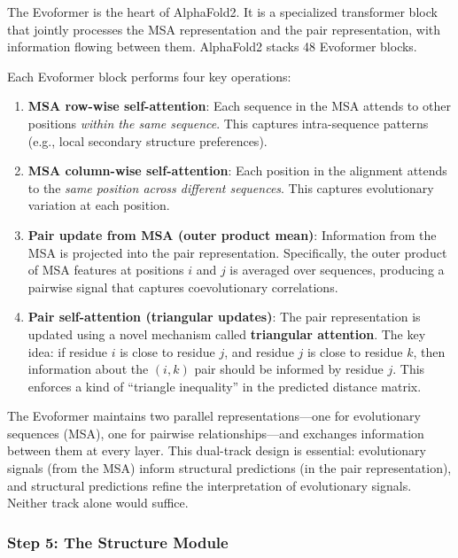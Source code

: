 The Evoformer is the heart of AlphaFold2. It is a specialized transformer block that jointly processes the MSA representation and the pair representation, with information flowing between them. AlphaFold2 stacks 48 Evoformer blocks.

Each Evoformer block performs four key operations:

\begin{enumerate}[leftmargin=1.8em]
  \item \textbf{MSA row-wise self-attention}: Each sequence in the MSA attends to other positions \emph{within the same sequence}. This captures intra-sequence patterns (e.g., local secondary structure preferences).

  \item \textbf{MSA column-wise self-attention}: Each position in the alignment attends to the \emph{same position across different sequences}. This captures evolutionary variation at each position.

  \item \textbf{Pair update from MSA (outer product mean)}: Information from the MSA is projected into the pair representation. Specifically, the outer product of MSA features at positions $i$ and $j$ is averaged over sequences, producing a pairwise signal that captures coevolutionary correlations.

  \item \textbf{Pair self-attention (triangular updates)}: The pair representation is updated using a novel mechanism called \textbf{triangular attention}. The key idea: if residue $i$ is close to residue $j$, and residue $j$ is close to residue $k$, then information about the $(i,k)$ pair should be informed by residue $j$. This enforces a kind of ``triangle inequality'' in the predicted distance matrix.
\end{enumerate}

\begin{keyinsight}
The Evoformer maintains two parallel representations---one for evolutionary sequences (MSA), one for pairwise relationships---and exchanges information between them at every layer. This dual-track design is essential: evolutionary signals (from the MSA) inform structural predictions (in the pair representation), and structural predictions refine the interpretation of evolutionary signals. Neither track alone would suffice.
\end{keyinsight}

\subsubsection{Step 5: The Structure Module}

